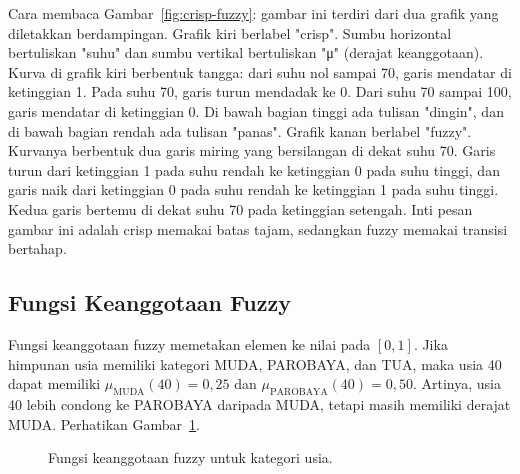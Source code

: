 \documentclass[11pt,a4paper]{article}
\begin{document}
Cara membaca Gambar~\ref{fig:crisp-fuzzy}: gambar ini terdiri dari dua grafik yang diletakkan berdampingan. Grafik kiri berlabel "crisp". Sumbu horizontal bertuliskan "suhu" dan sumbu vertikal bertuliskan "μ" (derajat keanggotaan). Kurva di grafik kiri berbentuk tangga: dari suhu nol sampai 70, garis mendatar di ketinggian 1. Pada suhu 70, garis turun mendadak ke 0. Dari suhu 70 sampai 100, garis mendatar di ketinggian 0. Di bawah bagian tinggi ada tulisan "dingin", dan di bawah bagian rendah ada tulisan "panas". Grafik kanan berlabel "fuzzy". Kurvanya berbentuk dua garis miring yang bersilangan di dekat suhu 70. Garis turun dari ketinggian 1 pada suhu rendah ke ketinggian 0 pada suhu tinggi, dan garis naik dari ketinggian 0 pada suhu rendah ke ketinggian 1 pada suhu tinggi. Kedua garis bertemu di dekat suhu 70 pada ketinggian setengah. Inti pesan gambar ini adalah crisp memakai batas tajam, sedangkan fuzzy memakai transisi bertahap.

\subsection{Fungsi Keanggotaan Fuzzy}

Fungsi keanggotaan fuzzy memetakan elemen ke nilai pada $[0,1]$. Jika himpunan usia memiliki kategori MUDA, PAROBAYA, dan TUA, maka usia 40 dapat memiliki $\mu_{\text{MUDA}}(40)=0{,}25$ dan $\mu_{\text{PAROBAYA}}(40)=0{,}50$. Artinya, usia 40 lebih condong ke PAROBAYA daripada MUDA, tetapi masih memiliki derajat MUDA. Perhatikan Gambar~\ref{fig:usia-fuzzy}.

\begin{figure}[H]
	\centering
	\caption{Fungsi keanggotaan fuzzy untuk kategori usia.}
	\label{fig:usia-fuzzy}
\end{figure}
\end{document}
